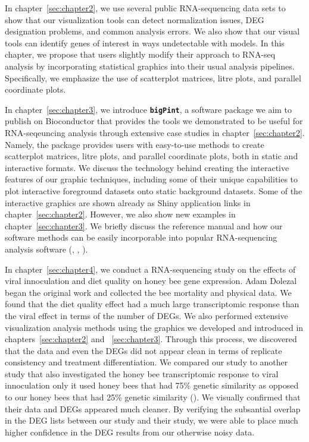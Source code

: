\documentclass[11pt,a4paper,oldfontcommands,openany]{memoir}
\numberwithin{equation}{section} %
\newcommand{\pkg}[1]{{\texttt{#1}}}
\begin{document}
In chapter~\ref{sec:chapter2}, we use several public RNA-sequencing data sets to show that our visualization tools can detect normalization issues, DEG designation problems, and common analysis errors. We also show that our visual tools can identify genes of interest in ways undetectable with models. In this chapter, we propose that users slightly modify their approach to RNA-seq analysis by incorporating statistical graphics into their usual analysis pipelines. Specifically, we emphasize the use of scatterplot matrices, litre plots, and parallel coordinate plots.

In chapter~\ref{sec:chapter3}, we introduce \textbf{\pkg{bigPint}}, a software package we aim to publish on Bioconductor that provides the tools we demonstrated to be useful for RNA-seqeuncing analysis through extensive case studies in chapter~\ref{sec:chapter2}. Namely, the package provides users with easy-to-use methods to create scatterplot matrices, litre plots, and parallel coordinate plots, both in static and interactive formats. We discuss the technology behind creating the interactive features of our graphic techniques, including some of their unique capabilities to plot interactive foreground datasets onto static background datasets. Some of the interactive graphics are shown already as Shiny application links in chapter~\ref{sec:chapter2}. However, we also show new examples in chapter~\ref{sec:chapter3}. We briefly discuss the reference manual and how our software methods can be easily incorporable into popular RNA-sequencing analysis software (\citealt{deseq2}, \citealt{edger}, \citealt{limma}).

In chapter~\ref{sec:chapter4}, we conduct a RNA-sequencing study on the effects of viral innoculation and diet quality on honey bee gene expression. Adam Dolezal began the original work and collected the bee mortality and physical data. We found that the diet quality effect had a much large transcriptomic response than the viral effect in terms of the number of DEGs. We also performed extensive visualization analysis methods using the graphics we developed and introduced in chapters~\ref{sec:chapter2} and ~\ref{sec:chapter3}. Through this process, we discovered that the data and even the DEGs did not appear clean in terms of replicate consistency and treatment differentiation. We compared our study to another study that also investigated the honey bee transcriptomic response to viral innoculation only it used honey bees that had 75\% genetic similarity as opposed to our honey bees that had 25\% genetic similarity (\citealt{galbraith}). We visually confirmed that their data and DEGs appeared much cleaner. By verifying the subsantial overlap in the DEG lists between our study and their study, we were able to place much higher confidence in the DEG results from our otherwise noisy data.
\end{document}
